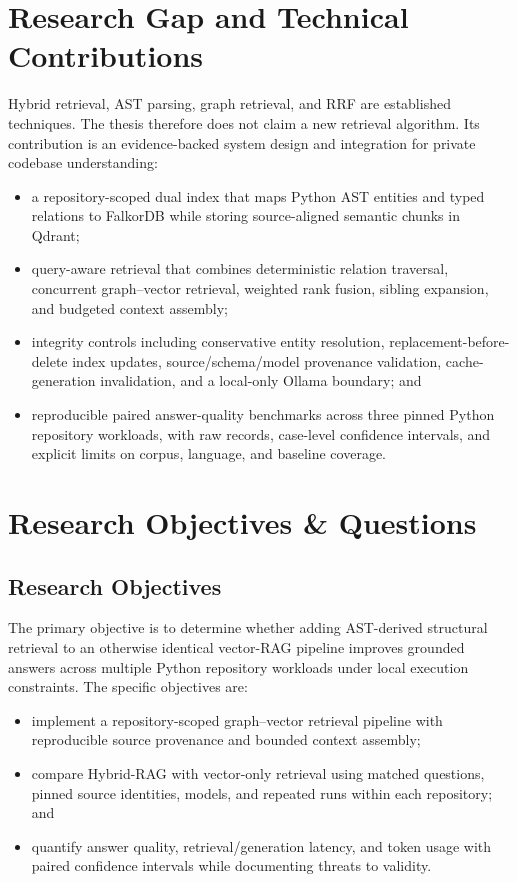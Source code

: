 \documentclass[12pt,letterpaper,oneside]{report}
\begin{document}
\section{Research Gap and Technical Contributions}
Hybrid retrieval, AST parsing, graph retrieval, and RRF are established techniques. The thesis therefore does not claim a new retrieval algorithm. Its contribution is an evidence-backed system design and integration for private codebase understanding:
\begin{itemize}
    \item a repository-scoped dual index that maps Python AST entities and typed relations to FalkorDB while storing source-aligned semantic chunks in Qdrant;
    \item query-aware retrieval that combines deterministic relation traversal, concurrent graph--vector retrieval, weighted rank fusion, sibling expansion, and budgeted context assembly;
    \item integrity controls including conservative entity resolution, replacement-before-delete index updates, source/schema/model provenance validation, cache-generation invalidation, and a local-only Ollama boundary; and
    \item reproducible paired answer-quality benchmarks across three pinned Python repository workloads, with raw records, case-level confidence intervals, and explicit limits on corpus, language, and baseline coverage.
\end{itemize}

\section{Research Objectives \& Questions}

\subsection{Research Objectives}
The primary objective is to determine whether adding AST-derived structural retrieval to an otherwise identical vector-RAG pipeline improves grounded answers across multiple Python repository workloads under local execution constraints. The specific objectives are:
\begin{itemize}
    \item implement a repository-scoped graph--vector retrieval pipeline with reproducible source provenance and bounded context assembly;
    \item compare Hybrid-RAG with vector-only retrieval using matched questions, pinned source identities, models, and repeated runs within each repository; and
    \item quantify answer quality, retrieval/generation latency, and token usage with paired confidence intervals while documenting threats to validity.
\end{itemize}
\end{document}
